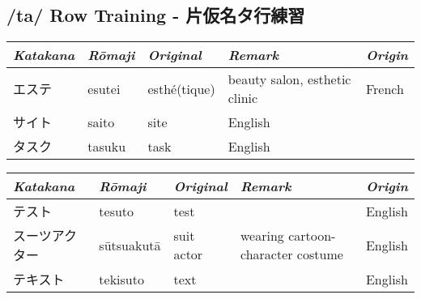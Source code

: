 \subsection{/ta/ Row Training - 片仮名タ行練習}
\Padding
\begin{longtable}[c]{p{2cm}p{2cm}p{3cm}p{6cm}p{2cm}}
\textit{Katakana}&\textit{Rōmaji}&\textit{Original}&\textit{Remark}&\textit{Origin}\\\hline
エステ        &esutei    &esthé(tique)&beauty salon, esthetic clinic    &French\\
サイト        &saito     &site        &English\\
タスク        &tasuku    &task        &English\\
\end{longtable}



\newpage
\Padding
\begin{longtable}[c]{p{3cm}p{2cm}p{2cm}p{6cm}p{2cm}}
\textit{Katakana}&\textit{Rōmaji}&\textit{Original}&\textit{Remark}&\textit{Origin}\\\hline
テスト        &tesuto    &test        &                                 &English\\
スーツアクター&sūtsuakutā&suit actor  &wearing cartoon-character costume&English\\
テキスト      &tekisuto  &text        &                                 &English\\
\end{longtable}



\newpage
